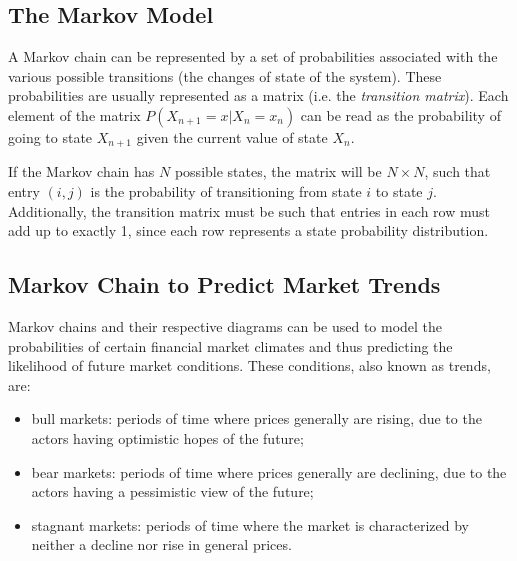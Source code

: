 
\subsection{The Markov Model}
A Markov chain can be represented by a set of probabilities associated with the various possible transitions (the changes of state of the system). These probabilities are usually represented as a matrix (i.e. the \emph{transition matrix}).
Each element of the matrix $P(X_{n+1} = x | X_n = x_n)$ can be read as the probability of going to state $X_{n+1}$ given the current value of state $X_n$. 

If the Markov chain has $N$ possible states, the matrix will be $N \times N$, such that entry $(i, j)$ is the probability of transitioning from state $i$ to state $j$. Additionally, the transition matrix must be such that entries in each row must add up to exactly 1, since each row represents a state probability distribution.


\subsection{Markov Chain to Predict Market Trends}
Markov chains and their respective diagrams can be used to model the probabilities of certain financial market climates and thus predicting the likelihood of future market conditions.
These conditions, also known as trends, are:
\begin{itemize}
\item bull markets: periods of time where prices generally are rising, due to the actors having optimistic hopes of the future;
\item bear markets: periods of time where prices generally are declining, due to the actors having a pessimistic view of the future;
\item stagnant markets: periods of time where the market is characterized by neither a decline nor rise in general prices.
\end{itemize}

